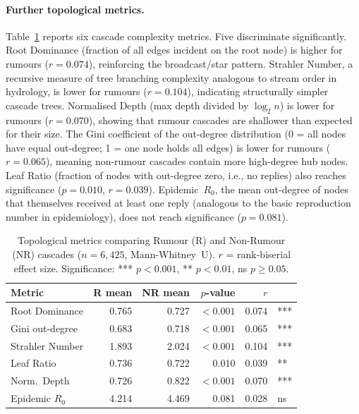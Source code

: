 \documentclass[runningheads]{llncs}
\begin{document}
\paragraph{Further topological metrics.}
Table~\ref{tab:topology} reports six cascade complexity metrics. Five discriminate
significantly. Root Dominance (fraction of all edges incident on the root node) is
higher for rumours ($r = 0.074$), reinforcing the broadcast/star pattern. Strahler
Number, a recursive measure of tree branching complexity analogous to stream order in
hydrology, is lower for rumours ($r = 0.104$), indicating structurally simpler cascade
trees. Normalised Depth (max depth divided by $\log_2 n$) is lower for rumours
($r = 0.070$), showing that rumour cascades are shallower than expected for their size.
The Gini coefficient of the out-degree distribution (0 = all nodes have
equal out-degree; 1 = one node holds all edges) is lower for rumours
($r = 0.065$), meaning non-rumour cascades contain more high-degree hub nodes.
Leaf Ratio (fraction of nodes with out-degree zero, i.e., no replies) also
reaches significance ($p = 0.010$, $r = 0.039$). Epidemic~$R_0$, the mean
out-degree of nodes that themselves received at least one reply (analogous to
the basic reproduction number in epidemiology), does not reach significance
($p = 0.081$).

\begin{table}[t]
\caption{Topological metrics comparing Rumour (R) and Non-Rumour (NR) cascades
($n = 6{,}425$, Mann-Whitney~U). $r$ = rank-biserial effect size.
Significance: *** $p < 0.001$, ** $p < 0.01$, ns $p \geq 0.05$.}
\label{tab:topology}
\centering
\begin{tabular}{lrrrrl}
\toprule
Metric & R mean & NR mean & $p$-value & $r$ & \\
\midrule
Root Dominance   & 0.765 & 0.727 & $<0.001$ & 0.074 & *** \\
Gini out-degree  & 0.683 & 0.718 & $<0.001$ & 0.065 & *** \\
Strahler Number  & 1.893 & 2.024 & $<0.001$ & 0.104 & *** \\
Leaf Ratio       & 0.736 & 0.722 & 0.010    & 0.039 & **  \\
Norm.\ Depth     & 0.726 & 0.822 & $<0.001$ & 0.070 & *** \\
Epidemic $R_0$   & 4.214 & 4.469 & 0.081    & 0.028 & ns  \\
\bottomrule
\end{tabular}
\end{table}
\end{document}

